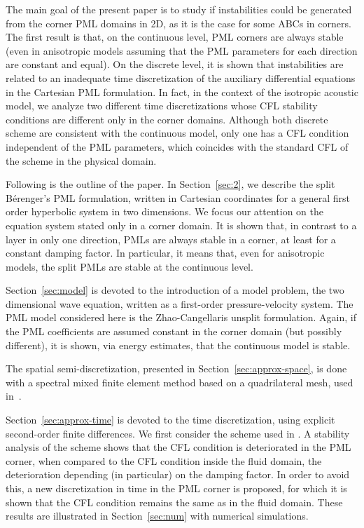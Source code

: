 \documentclass[a4paper]{article}
\begin{document}
The main goal of the present paper is to study if instabilities could be
generated from the corner PML domains in 2D, as it is the case for some
ABCs in corners. The first result is that, on the continuous level,
PML corners are always stable (even in anisotropic models
assuming that the PML parameters for each direction are constant
and equal). On the discrete level, it is shown that
instabilities are related to an inadequate
time discretization of the auxiliary differential equations in the 
Cartesian PML formulation. In fact, in the context of the isotropic
acoustic model, we analyze two different time discretizations whose
CFL stability conditions are different only in the corner domains. 
Although both discrete scheme are consistent with the continuous model, 
only one has a CFL condition independent of the PML parameters, 
which coincides with the standard CFL of the scheme in the physical domain. 

Following is the outline of the paper. In Section~\ref{sec:2}, 
we describe the split B\'erenger's PML
formulation, written in Cartesian coordinates for a general first order 
hyperbolic system in two dimensions. We focus our attention on the 
equation system stated only in a corner domain. It is shown that, 
in contrast to a  layer in only one direction, PMLs are always stable 
in a corner, at least for a constant damping factor. In particular, 
it means that, even for anisotropic models, the split PMLs are stable 
at the continuous level. 

Section~\ref{sec:model} is devoted to the introduction of a model problem, 
the two dimensional wave equation, written as a first-order pressure-velocity 
system. The PML model considered here is the Zhao-Cangellaris unsplit formulation. 
Again, if the PML coefficients are assumed constant in the corner domain
(but possibly different), it is shown, via energy estimates, that the continuous 
model is stable.

The spatial semi-discretization, presented in Section~\ref{sec:approx-space}, 
is done with a spectral mixed finite element method based  on a quadrilateral 
mesh, used in~\cite{fauqueux}.

Section~\ref{sec:approx-time} is devoted to the time discretization, 
using explicit second-order finite differences. We first consider the 
scheme used in \cite{fauqueux}. A stability analysis of the scheme shows 
that the CFL condition  is deteriorated in the PML corner, when compared
to the CFL condition inside the fluid domain, the deterioration depending 
(in particular) on the damping factor. In order to avoid this, a new 
discretization in time in the PML corner is proposed, for which it is 
shown  that the CFL condition remains the same as in the fluid domain. 
These results are illustrated in Section~\ref{sec:num} with numerical 
simulations. 
\end{document}
